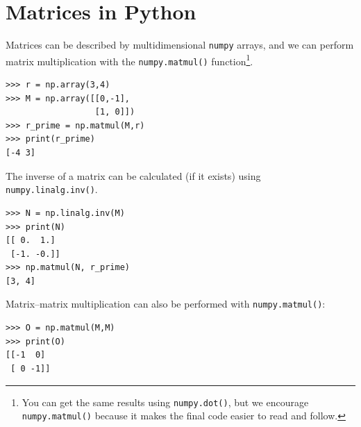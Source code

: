 \documentclass[a4paper]{article}
\begin{document}
\section{Matrices in Python}
Matrices can be described by multidimensional \texttt{numpy} arrays, and we can perform matrix multiplication with the \texttt{numpy.matmul()} function\footnote{You can get the same results using \texttt{numpy.dot()}, but we encourage \texttt{numpy.matmul()} because it makes the final code easier to read and follow.}.
\begin{lstlisting}
>>> r = np.array(3,4)
>>> M = np.array([[0,-1],
                  [1, 0]])
>>> r_prime = np.matmul(M,r)
>>> print(r_prime)
[-4 3]
\end{lstlisting}
The inverse of a matrix can be calculated (if it exists) using \texttt{numpy.linalg.inv()}.
\begin{lstlisting}
>>> N = np.linalg.inv(M)
>>> print(N)
[[ 0.  1.]
 [-1. -0.]]
>>> np.matmul(N, r_prime)
[3, 4]
\end{lstlisting}
Matrix--matrix multiplication can also be performed with \texttt{numpy.matmul()}:
\begin{lstlisting}
>>> O = np.matmul(M,M)
>>> print(O)
[[-1  0]
 [ 0 -1]]
 \end{lstlisting}

%
%
\end{document}
